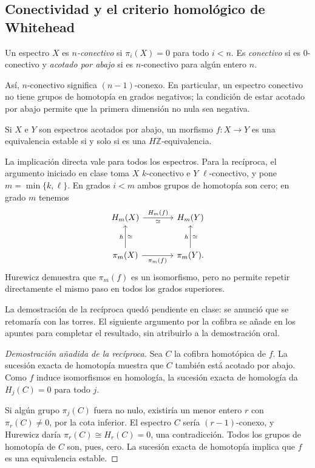 \subsection{Conectividad y el criterio homológico de Whitehead}
\begin{defi}
Un espectro $X$ es \emph{$n$-conectivo} si $\pi_i(X)=0$ para todo $i<n$. Es \emph{conectivo} si es $0$-conectivo y \emph{acotado por abajo} si es $n$-conectivo para algún entero $n$.
\end{defi}
Así, $n$-conectivo significa $(n-1)$-conexo. En particular, un espectro conectivo no tiene grupos de homotopía en grados negativos; la condición de estar acotado por abajo permite que la primera dimensión no nula sea negativa.

\begin{coro}\label{coro:c23-whitehead}
Si $X$ e $Y$ son espectros acotados por abajo, un morfismo $f\colon X\to Y$ es una equivalencia estable si y solo si es una $H\mathbb Z$-equivalencia.
\end{coro}

La implicación directa vale para todos los espectros. Para la recíproca, el argumento iniciado en clase toma $X$ $k$-conectivo e $Y$ $\ell$-conectivo, y pone $m=\min\{k,\ell\}$. En grados $i<m$ ambos grupos de homotopía son cero; en grado $m$ tenemos
\[
\begin{tikzcd}[column sep=large,row sep=large]
H_m(X)\arrow[r,"H_m(f)","\simeq"']&H_m(Y)\\
\pi_m(X)\arrow[u,"h","\simeq"']\arrow[r,"\pi_m(f)"']
&\pi_m(Y)\arrow[u,"h","\simeq"'].
\end{tikzcd}
\]
Hurewicz demuestra que $\pi_m(f)$ es un isomorfismo, pero no permite repetir directamente el mismo paso en todos los grados superiores.

\begin{nota}
La demostración de la recíproca quedó pendiente en clase: se anunció que se retomaría con las torres. El siguiente argumento por la cofibra se añade en los apuntes para completar el resultado, sin atribuirlo a la demostración oral.
\end{nota}

\begin{proof}[Demostración añadida de la recíproca]
Sea $C$ la cofibra homotópica de $f$. La sucesión exacta de homotopía muestra que $C$ también está acotado por abajo. Como $f$ induce isomorfismos en homología, la sucesión exacta de homología da $H_j(C)=0$ para todo $j$.

Si algún grupo $\pi_j(C)$ fuera no nulo, existiría un menor entero $r$ con $\pi_r(C)\ne0$, por la cota inferior. El espectro $C$ sería $(r-1)$-conexo, y Hurewicz daría $\pi_r(C)\cong H_r(C)=0$, una contradicción. Todos los grupos de homotopía de $C$ son, pues, cero. La sucesión exacta de homotopía implica que $f$ es una equivalencia estable.
\end{proof}

